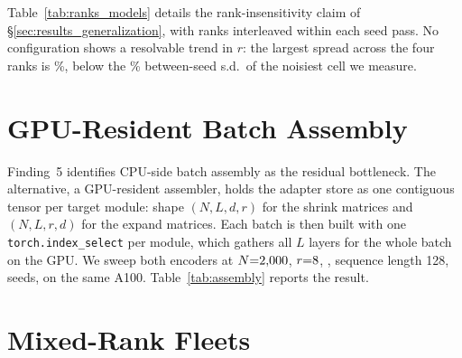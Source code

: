 \documentclass[11pt]{article}
\begin{document}
Table~\ref{tab:ranks_models} details the rank-insensitivity claim of
\S\ref{sec:results_generalization}, with ranks interleaved within each seed
pass. No configuration shows a resolvable trend in $r$: the largest spread
across the four ranks is \GenRankSpreadAllMaxPct\%, below the
\GenSeedSdWorstPct\% between-seed s.d.\ of the noisiest cell we measure.

\begin{table}[t]
  \centering
  \scriptsize
  \setlength{\tabcolsep}{2pt}
  \caption{p50 latency (ms) at each LoRA rank
    ($\mathcal{B}{=}\HeadlineBatch$, $N{=}1{,}000$, mean over
    \SweepNumSeeds{} seeds). \emph{Spread} is
  $(\max-\min)/\min$ across the four ranks.}
  \label{tab:ranks_models}
  
\end{table}

\section{GPU-Resident Batch Assembly}
\label{app:assembly}

Finding~5 identifies CPU-side batch assembly as the residual bottleneck. The
alternative, a GPU-resident assembler, holds the adapter store as one contiguous
tensor per target module: shape $(N, L, d, r)$ for the shrink matrices and
$(N, L, r, d)$ for the expand matrices. Each batch is then built with one
\texttt{torch.index\_select} per module, which gathers all $L$ layers for the
whole batch on the GPU. We sweep both encoders at
$N{=}\AsmAdapters{}$, $r{=}\HeadlineRank$, \HeadlineDtype{}, sequence length
128, \AsmSeeds{} seeds, on the same A100.
Table~\ref{tab:assembly} reports the result.

\begin{table}[h]
  \centering
  \small
  \setlength{\tabcolsep}{4pt}
  \caption{CPU baseline assembler (\emph{base}) versus the GPU-resident
    \texttt{index\_select} assembler (\emph{idx-sel}) at $N{=}\AsmAdapters{}$,
    $r{=}\HeadlineRank$, \HeadlineDtype{}, \AsmSeeds{} seeds.
    \emph{Asm.\ share} is assembly as a fraction of end-to-end latency, before
    $\to$ after.}
  \label{tab:assembly}
  
\end{table}

\section{Mixed-Rank Fleets}
\label{app:mixed_rank}
\end{document}

